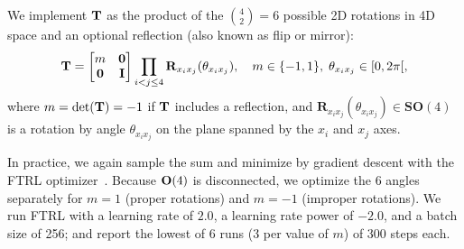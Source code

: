 We implement $\mathbf{T}$ as the product of the $\binom{4}{2}=6$ possible 2D rotations in 4D space and an optional reflection (also known as flip or mirror):
\begin{equation*}
    \mathbf{T} =
    \begin{bmatrix}
        m & \mathbf{0} \\
        \mathbf{0} & \mathbf{I} \\
    \end{bmatrix}
    \prod_{i < j \leq 4} \mathbf{R}_{x_i x_j}(\theta_{x_i x_j}),
    \quad m \in \{-1,1\}, \; \theta_{x_i x_j} \in [0, 2\pi[,
\end{equation*}
where $m = \det(\mathbf{T}) = -1$ if $\mathbf{T}$ includes a reflection, and $\mathbf{R}_{x_i x_j}(\theta_{x_i x_j}) \in \mathbf{SO}(4)$ is a rotation by angle $\theta_{x_i x_j}$ on the plane spanned by the $x_i$ and $x_j$ axes.

In practice, we again sample the sum and minimize  by gradient descent with the FTRL optimizer~\cite{mcmahan_ad_2013}.
Because $\mathrm{\mathbf{O}}(4)$ is disconnected, we optimize the 6 angles separately for $m = 1$ (proper rotations) and $m = -1$ (improper rotations).
We run FTRL with a learning rate of $2.0$, a learning rate power of $-2.0$, and a batch size of 256; and report the lowest of 6 runs (3 per value of $m$) of 300 steps each.


